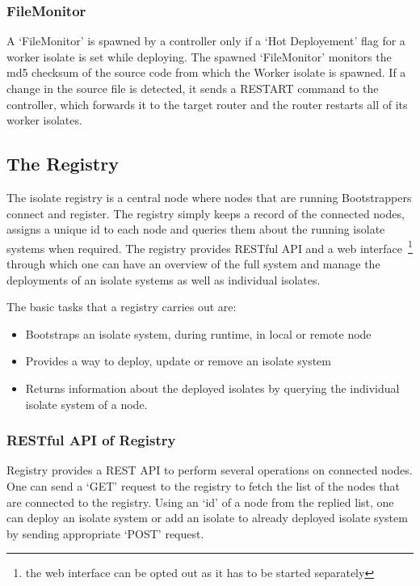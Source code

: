   \subsubsection{FileMonitor}
  \label{subsubsec:fileMonitor}
  A ‘FileMonitor’ is spawned by a controller only if a ‘Hot Deployement’ flag for a worker isolate is set while deploying. The spawned ‘FileMonitor’ monitors the md5 checksum of the source code from which the Worker isolate is spawned. If a change in the source file is detected, it sends a RESTART command to the controller, which forwards it to the target router and the router restarts all of its worker isolates.

\subsection{The Registry}
\label{subsec:registry}
The isolate registry is a central node where nodes that are running Bootstrappers connect and register. The registry simply keeps a record of the connected nodes, assigns a unique id to each node and queries them about the running isolate systems when required. The registry provides RESTful API and a web interface~\footnote{the web interface can be opted out as it has to be started separately} through which one can have an overview of the full system and manage the deployments of an isolate systems as well as individual isolates.

The basic tasks that a registry carries out are:
\begin{itemize}
  \item Bootstraps an isolate system, during runtime, in local or remote node
  \item Provides a way to deploy, update or remove an isolate system
  \item Returns information about the deployed isolates by querying the individual isolate system of a node.
\end{itemize}

  \subsubsection{RESTful API of Registry}
  \label{subsec:restApi}
  Registry provides a REST API to perform several operations on connected nodes. One can send a ‘GET’ request to the registry to fetch the list of the nodes that are connected to the registry. Using an ‘id’ of a node from the replied list, one can deploy an isolate system or add an isolate to already deployed isolate system by sending appropriate ‘POST’ request.

